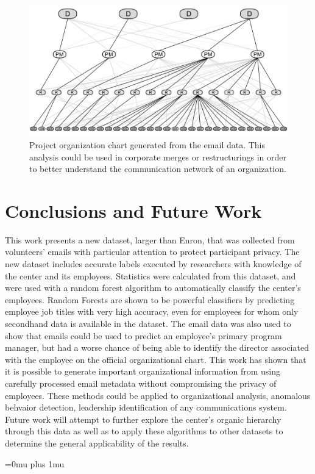 \documentclass[10pt,twocolumn,conference]{IEEEtran}
\begin{document}
\begin{figure}[t]
	\centering
	\includegraphics[width=\columnwidth,trim={0mm 1mm 0mm 1mm},clip]{orgChart_3con_BW}
    \vspace{-17pt}
	\caption{Project organization chart generated from the email data. This analysis could be used in corporate merges or restructurings in order to better understand the communication network of an organization.}
	\vspace{-18pt}
	\label{fig:org_chart}
\end{figure}

\section{Conclusions and Future Work} \label{Conclusions}
This work presents a new dataset, larger than Enron, that was collected from volunteers' emails with particular attention to protect participant privacy.
The new dataset includes accurate labels executed by researchers with knowledge of the center and its employees.
Statistics were calculated from this dataset, and were used with a random forest algorithm to automatically classify the center's employees.
Random Forests are shown to be powerful classifiers by predicting employee job titles with very high accuracy, even for employees for whom only secondhand data is available in the dataset.
The email data was also used to show that emails could be used to predict an employee's primary program manager, but had a worse chance of being able to identify the director associated with the employee on the official organizational chart.
This work has shown that it is possible to generate important organizational information from using carefully processed email metadata without compromising the privacy of employees.
These methods could be applied to organizational analysis, anomalous behvaior detection, leadership identification of any communications system.
Future work will attempt to further explore the center's organic hierarchy through this data as well as to apply these algorithms to other datasets to determine the general applicability of the results.

\Urlmuskip=0mu plus 1mu\relax


\end{document}
